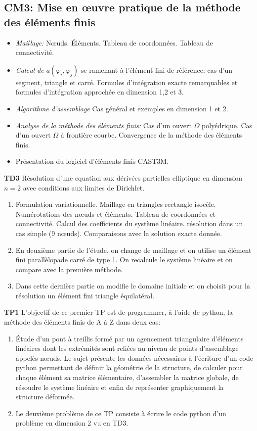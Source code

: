 \documentclass{article}
\begin{document}
\subsection*{CM3: Mise en œuvre pratique de la méthode des éléments finis}
\begin{itemize}[label=\textbullet, font=\small \color{greenESTP}]
\item {\em Maillage:} Nœuds. Éléments. Tableau de coordonnées. Tableau de connectivité.
\item {\em Calcul de $a(\varphi_i,\varphi_j)$} se ramenant à l'élément fini de référence: cas d'un segment, triangle et carré. Formules d'intégration exacte remarquables et formules d'intégration approchée en dimension 1,2 et 3.
\item {\em Algorithme d'assemblage} Cas général et exemples en dimension 1 et 2.
\item {\em Analyse de la méthode des éléments finis:} Cas d'un ouvert $\Omega$ polyédrique. Cas d'un ouvert $\Omega$  à frontière courbe. Convergence de la méthode des éléments finis.
\item Présentation du logiciel d'éléments finis CAST3M.
\end{itemize}
{\bf TD3} Résolution d'une equation aux dérivées partielles elliptique en dimension $n=2$ avec conditions aux limites de Dirichlet. 
\begin{enumerate}
\item Formulation variationnelle. Maillage en triangles rectangle isocèle. Numérotations des nœuds et éléments. Tableau de coordonnées et connectivité. Calcul des coefficients du système linéaire. résolution dans un cas simple (9 nœuds). Comparaisons avec la solution exacte donnée.
\item En deuxième partie de l'étude, on change de maillage et on utilise un élément fini parallèlopade carré de type 1. On recalcule le système linéaire et on compare avec la première méthode.
\item Dans cette dernière partie on modifie le domaine initiale et on choisit pour la résolution un élément fini triangle équilatéral.  
\end{enumerate}
\noindent
{\bf TP1} L'objectif de ce premier TP est de programmer, à l'aide de python, la méthode des éléments finis de A à Z dans deux cas:
\begin{enumerate}
\item Étude d'un pont à treillis formé par un agencement triangulaire d'éléments linéaires dont les extrémités sont reliées au niveau de points d'assemblage appelés nœuds. Le sujet présente les données nécessaires à l'écriture d'un code python permettant de définir la géométrie de la structure, de calculer pour chaque élément sa matrice élémentaire, d'assembler la matrice globale, de résoudre le système linéaire et enfin de représenter graphiquement la structure déformée.
\item Le deuxième problème de ce TP consiste à écrire le code python d'un problème en dimension 2 vu en TD3.
\end{enumerate}
\end{document}
